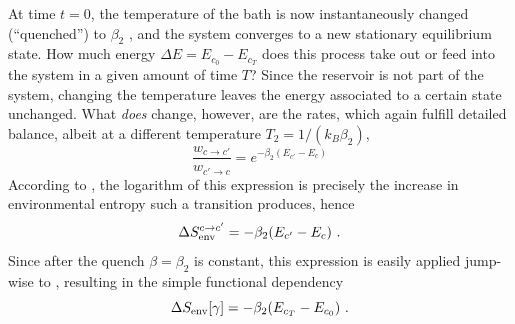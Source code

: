 At time \(t = 0\), the temperature of the bath is now instantaneously changed (``quenched'') to \(\beta_2\) , and the system converges to a new stationary equilibrium state. How much energy \(\Delta E = E_{c_0} - E_{c_T}\) does this process take out or feed into the system in a given amount of time \(T\)?
Since the reservoir is not part of the system, changing the temperature leaves the energy associated to a certain state unchanged. What \emph{does} change, however, are the rates, which again fulfill detailed balance, albeit at a different temperature \(T_2 = 1/(k_B\beta_2)\),
%
\begin{equation}
	\frac{w_{c\to c'}}{w_{c'\to c}}
	= e^{-\beta_2(E_{c'}-E_c)}
\end{equation}
%
According to , the logarithm of this expression is precisely the increase in environmental entropy such a transition produces, hence
%
\begin{equation}
	\Delta S_\text{env}^{c\to c'} = -\beta_2(E_{c'}-E_c) ~.
\end{equation}
%
Since after the quench \(\beta = \beta_2\) is constant, this expression is easily applied jump-wise to , resulting in the simple functional dependency
%
\begin{equation}
	\label{eqn:Delta SEnv in terms of energies}
	\Delta S_\text{env}[\gamma] = -\beta_2(E_{c_T}-E_{c_0}) ~.
\end{equation}
%

